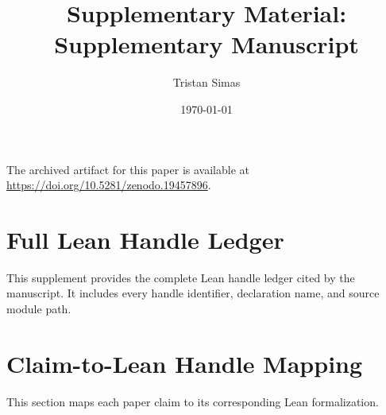 \documentclass[11pt]{article}
\providecommand{\PaperTitleAuto}{Supplementary Manuscript}
\begin{document}
\title{Supplementary Material: \PaperTitleAuto}
\author{Tristan Simas}
\date{\today}
\maketitle

The archived artifact for this paper is available at \url{https://doi.org/10.5281/zenodo.19457896}.

\section{Full Lean Handle Ledger}

This supplement provides the complete Lean handle ledger cited by the manuscript.
It includes every handle identifier, declaration name, and source module path.


\section{Claim-to-Lean Handle Mapping}

This section maps each paper claim to its corresponding Lean formalization.

\end{document}
